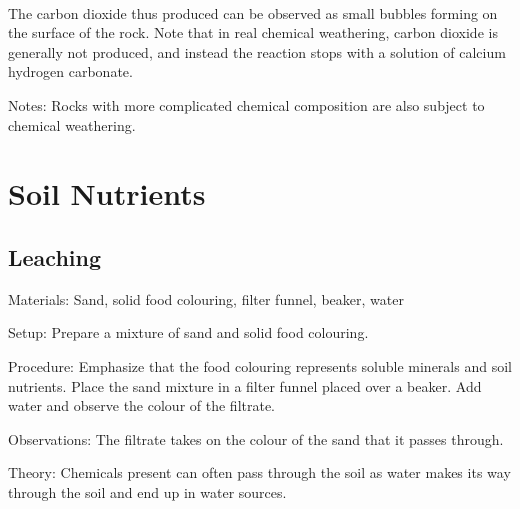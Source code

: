 \begin{multicols}{2}
\begin{description*}
{\centering
{}\\	
\raggedright

The carbon dioxide thus produced can be observed as small bubbles forming on the surface of the rock. Note that in real chemical weathering, carbon dioxide is generally not produced, and instead the reaction stops with a solution of calcium hydrogen carbonate.}
\item[Notes:]{Rocks with more complicated chemical composition are also subject to chemical weathering.}
\end{description*}


\section*{Soil Nutrients}


\subsection{Leaching}


\begin{description*}
\item[Materials:]{Sand, solid food colouring, filter funnel, beaker, water}
\item[Setup:]{Prepare a mixture of sand and solid food colouring.}
\item[Procedure:]{Emphasize that the food colouring represents soluble minerals and soil nutrients. Place the sand mixture in a filter funnel placed over a beaker. Add water and observe the colour of the filtrate.}
\item[Observations:]{The filtrate takes on the colour of the sand that it passes through.}
\item[Theory:]{Chemicals present can often pass through the soil as water makes its way through the soil and end up in water sources.}
\end{description*}


\end{multicols}

